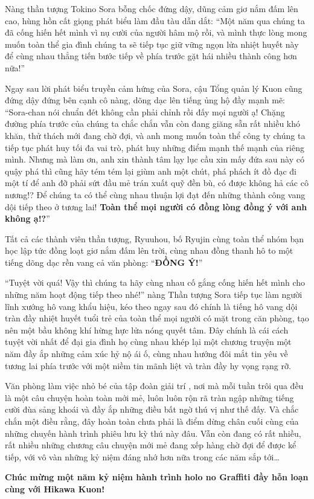 \documentclass[../main.tex]{subfiles}
\begin{document}
Nàng thần tượng Tokino Sora bỗng chốc đứng dậy, dũng cảm giơ nắm đấm lên cao, hùng hồn cất giọng phát biểu làm đầu tàu dẫn dắt: ``Một năm qua chúng ta đã cống hiến hết mình vì nụ cười của người hâm mộ rồi, và mình thực lòng mong muốn toàn thể gia đình chúng ta sẽ tiếp tục giữ vững ngọn lửa nhiệt huyết này để cùng nhau thẳng tiến bước tiếp về phía trước gặt hái nhiều thành công hơn nữa!''

Ngay sau lời phát biểu truyền cảm hứng của Sora, cậu Tổng quản lý Kuon cũng đứng dậy đứng bên cạnh cô nàng, dõng dạc lên tiếng ủng hộ đầy mạnh mẽ: ``Sora-chan nói chuẩn đét không cần phải chỉnh rồi đấy mọi người ạ! Chặng đường phía trước của chúng ta chắc chắn vẫn còn đang giăng sẵn rất nhiều khó khăn, thử thách mới đang chờ đợi, và anh mong muốn toàn thể công ty chúng ta tiếp tục phát huy tối đa vai trò, phát huy những điểm mạnh thế mạnh của riêng mình. Nhưng mà làm ơn, anh xin thành tâm lạy lục cầu xin mấy đứa sau này có quậy phá thì cũng hãy tém tém lại giùm anh một chút, phá phách ít đồ đạc đi một tí để anh đỡ phải sứt đầu mẻ trán xuất quỹ đền bù, có được không hả các cô nương!? Để chúng ta có thể cùng nhau thuận lợi đạt đến những thành công vang dội tiếp theo ở tương lai! \textbf{Toàn thể mọi người có đồng lòng đồng ý với anh không ạ!?}''

Tất cả các thành viên thần tượng, Ryuuhou, bố Ryujin cùng toàn thể nhóm bạn học lập tức đồng loạt giơ nắm đấm lên trời, cùng nhau đồng thanh hô to một tiếng dõng dạc rền vang cả văn phòng: ``\textbf{ĐỒNG Ý!}''

``Tuyệt vời quá! Vậy thì chúng ta hãy cùng nhau cố gắng cống hiến hết mình cho những năm hoạt động tiếp theo nhé!'' nàng Thần tượng Sora tiếp tục làm người lĩnh xướng hô vang khẩu hiệu, kéo theo ngay sau đó chính là tiếng hô vang dội tràn đầy nhiệt huyết tuổi trẻ của toàn thể mọi người có mặt trong căn phòng, tạo nên một bầu không khí hừng hực lửa nóng quyết tâm. Đây chính là cái cách tuyệt vời nhất để đại gia đình họ cùng nhau khép lại một chương truyện một năm đầy ắp những cảm xúc hỷ nộ ái ố, cùng nhau hướng đôi mắt tin yêu về tương lai phía trước với một niềm tin mãnh liệt và tràn đầy hy vọng rạng rỡ.

Văn phòng làm việc nhỏ bé của tập đoàn giải trí \hll, nơi mà mỗi tuần trôi qua đều là một câu chuyện hoàn toàn mới mẻ, luôn luôn rộn rã tràn ngập những tiếng cười đùa sảng khoái và đầy ắp những điều bất ngờ thú vị như thế đấy. Và chắc chắn một điều rằng, đây hoàn toàn chưa phải là điểm dừng chân cuối cùng của những chuyến hành trình phiêu lưu kỳ thú này đâu. Vẫn còn đang có rất nhiều, rất nhiều những chương câu chuyện mới mẻ đang xếp hàng chờ đợi để được kể tiếp, với vô vàn những kỷ niệm đáng nhớ hơn nữa trong các năm sắp tới\dots

\begin{center}
  \textbf{\Large Chúc mừng một năm kỷ niệm hành trình holo no Graffiti đầy hỗn loạn cùng với Hikawa Kuon!}
\end{center}
\end{document}
